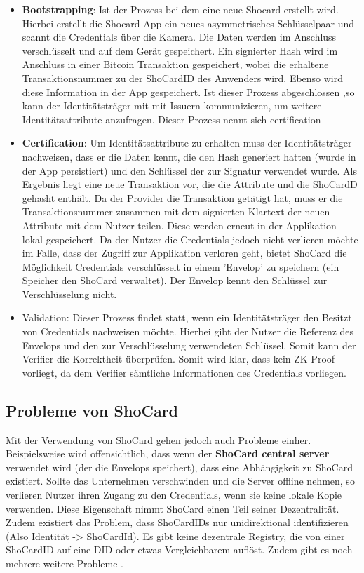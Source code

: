 \begin{itemize}
	\item \textbf{Bootstrapping}: Ist der Prozess bei dem eine neue Shocard erstellt wird. Hierbei erstellt die Shocard-App ein neues asymmetrisches Schlüsselpaar und scannt die Credentials über die Kamera. Die Daten werden im Anschluss verschlüsselt und auf dem Gerät gespeichert. Ein signierter Hash wird im Anschluss in einer Bitcoin Transaktion gespeichert, wobei die erhaltene Transaktionsnummer zu der ShoCardID des Anwenders wird. Ebenso wird diese Information in der App gespeichert. Ist dieser Prozess abgeschlossen ,so kann der Identitätsträger mit mit Issuern kommunizieren, um weitere Identitätsattribute anzufragen. Dieser Prozess nennt sich certification
	\item \textbf{Certification}: Um Identitätsattribute zu erhalten muss der Identitätsträger nachweisen, dass er die Daten kennt, die den Hash generiert hatten (wurde in der App persistiert) und den Schlüssel der zur Signatur verwendet wurde. Als Ergebnis liegt eine neue Transaktion vor, die die Attribute und die ShoCardD gehasht enthält. Da der Provider die Transaktion getätigt hat, muss er die Transaktionsnummer zusammen mit dem signierten Klartext der neuen Attribute mit dem Nutzer teilen. Diese werden erneut in der Applikation lokal gespeichert. Da der Nutzer die Credentials jedoch nicht verlieren möchte im Falle, dass der Zugriff zur Applikation verloren geht, bietet ShoCard die Möglichkeit Credentials verschlüsselt in einem 'Envelop' zu speichern (ein Speicher den ShoCard verwaltet). Der Envelop kennt den Schlüssel zur Verschlüsselung nicht.
	\item Validation: Dieser Prozess findet statt, wenn ein Identitätsträger den Besitzt von Credentials nachweisen möchte. Hierbei gibt der Nutzer die Referenz des Envelops und den zur Verschlüsselung verwendeten Schlüssel. Somit kann der Verifier die Korrektheit überprüfen. Somit wird klar, dass kein ZK-Proof vorliegt, da dem Verifier sämtliche Informationen des Credentials vorliegen.	
\end{itemize}

\subsection{Probleme von ShoCard}
Mit der Verwendung von ShoCard gehen jedoch auch Probleme einher. Beispielsweise wird offensichtlich, dass wenn der \textbf{ShoCard central server} verwendet wird (der die Envelops speichert), dass eine Abhängigkeit zu ShoCard existiert. Sollte das Unternehmen verschwinden und die Server offline nehmen, so verlieren Nutzer ihren Zugang zu den Credentials, wenn sie keine lokale Kopie verwenden. Diese Eigenschaft nimmt ShoCard einen Teil seiner Dezentralität. Zudem existiert das Problem, dass ShoCardIDs nur unidirektional identifizieren (Also Identität -> ShoCardId). Es gibt keine dezentrale Registry, die von einer ShoCardID auf eine DID oder etwas Vergleichbarem auflöst. Zudem gibt es noch mehrere weitere Probleme \cite{ID46}.